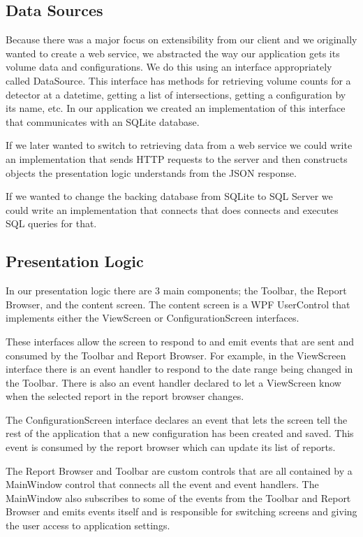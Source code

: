 \documentclass{article}
\begin{document}
\subsection{Data Sources}
Because there was a major focus on extensibility from our client and we originally wanted to create a web service, we abstracted the way our application gets its volume data and configurations. We do this using an interface appropriately called DataSource. This interface has methods for retrieving volume counts for a detector at a datetime, getting a list of intersections, getting a configuration by its name, etc. In our application we created an implementation of this interface that communicates with an SQLite database.

If we later wanted to switch to retrieving data from a web service we could write an implementation that sends HTTP requests to the server and then constructs objects the presentation logic understands from the JSON response.

If we wanted to change the backing database from SQLite to SQL Server we could write an implementation that connects that does connects and executes SQL queries for that.

\subsection{Presentation Logic}
In our presentation logic there are 3 main components; the Toolbar, the Report Browser, and the content screen. The content screen  is a WPF UserControl that implements either the ViewScreen or ConfigurationScreen interfaces. 

These interfaces allow the screen to respond to and emit events that are sent and consumed by the Toolbar and Report Browser. For example, in the ViewScreen interface there is an event handler to respond to the date range being changed in the Toolbar. There is also an event handler declared to let a ViewScreen know when the selected report in the report browser changes.

The ConfigurationScreen interface declares an event that lets the screen tell the rest of the application that a new configuration has been created and saved. This event is consumed by the report browser which can update its list of reports.

The Report Browser and Toolbar are custom controls that are all contained by a MainWindow control that connects all the event and event handlers. The MainWindow also subscribes to some of the events from the Toolbar and Report Browser and emits events itself and is responsible for switching screens and giving the user access to application settings.
\end{document}
